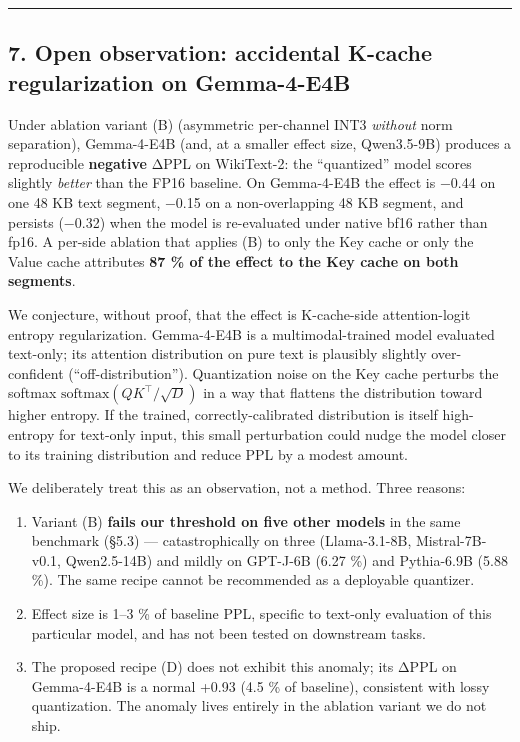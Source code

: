 \begin{center}\rule{0.5\linewidth}{0.5pt}\end{center}

\subsection{7. Open observation: accidental K-cache regularization on
Gemma-4-E4B}\label{open-observation-accidental-k-cache-regularization-on-gemma-4-e4b}

Under ablation variant (B) (asymmetric per-channel INT3 \emph{without}
norm separation), Gemma-4-E4B (and, at a smaller effect size,
Qwen3.5-9B) produces a reproducible \textbf{negative} ΔPPL on
WikiText-2: the ``quantized'' model scores slightly \emph{better} than
the FP16 baseline. On Gemma-4-E4B the effect is −0.44 on one 48 KB text
segment, −0.15 on a non-overlapping 48 KB segment, and persists (−0.32)
when the model is re-evaluated under native bf16 rather than fp16. A
per-side ablation that applies (B) to only the Key cache or only the
Value cache attributes \textbf{87 \% of the effect to the Key cache on
both segments}.

We conjecture, without proof, that the effect is K-cache-side
attention-logit entropy regularization. Gemma-4-E4B is a
multimodal-trained model evaluated text-only; its attention distribution
on pure text is plausibly slightly over-confident
(``off-distribution''). Quantization noise on the Key cache perturbs the
softmax \(\mathrm{softmax}(QK^\top / \sqrt{D})\) in a way that flattens
the distribution toward higher entropy. If the trained,
correctly-calibrated distribution is itself high-entropy for text-only
input, this small perturbation could nudge the model closer to its
training distribution and reduce PPL by a modest amount.

We deliberately treat this as an observation, not a method. Three
reasons:

\begin{enumerate}
\def\labelenumi{\arabic{enumi}.}
\tightlist
\item
  Variant (B) \textbf{fails our threshold on five other models} in the
  same benchmark (§5.3) --- catastrophically on three (Llama-3.1-8B,
  Mistral-7B-v0.1, Qwen2.5-14B) and mildly on GPT-J-6B (6.27 \%) and
  Pythia-6.9B (5.88 \%). The same recipe cannot be recommended as a
  deployable quantizer.
\item
  Effect size is 1--3 \% of baseline PPL, specific to text-only
  evaluation of this particular model, and has not been tested on
  downstream tasks.
\item
  The proposed recipe (D) does not exhibit this anomaly; its ΔPPL on
  Gemma-4-E4B is a normal +0.93 (4.5 \% of baseline), consistent with
  lossy quantization. The anomaly lives entirely in the ablation variant
  we do not ship.
\end{enumerate}

